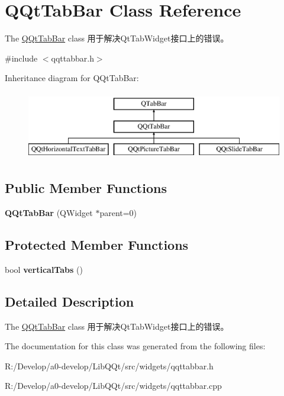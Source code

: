 \hypertarget{class_q_qt_tab_bar}{}\section{Q\+Qt\+Tab\+Bar Class Reference}
\label{class_q_qt_tab_bar}


The \mbox{\hyperlink{class_q_qt_tab_bar}{Q\+Qt\+Tab\+Bar}} class 用于解决\+Qt\+Tab\+Widget接口上的错误。  




{\ttfamily \#include $<$qqttabbar.\+h$>$}

Inheritance diagram for Q\+Qt\+Tab\+Bar\+:\begin{figure}[H]
\begin{center}
\leavevmode
\includegraphics[height=3.000000cm]{class_q_qt_tab_bar}
\end{center}
\end{figure}
\subsection*{Public Member Functions}
\begin{DoxyCompactItemize}
\item 
\mbox{\label{class_q_qt_tab_bar_aa15f619520c3707c7cbc90f5cb1c2c05}} 
{\bfseries Q\+Qt\+Tab\+Bar} (Q\+Widget $\ast$parent=0)
\end{DoxyCompactItemize}
\subsection*{Protected Member Functions}
\begin{DoxyCompactItemize}
\item 
\mbox{\label{class_q_qt_tab_bar_a73e9ea2f2ec44d4430fc23c880be93c8}} 
bool {\bfseries vertical\+Tabs} ()
\end{DoxyCompactItemize}


\subsection{Detailed Description}
The \mbox{\hyperlink{class_q_qt_tab_bar}{Q\+Qt\+Tab\+Bar}} class 用于解决\+Qt\+Tab\+Widget接口上的错误。 

The documentation for this class was generated from the following files\+:\begin{DoxyCompactItemize}
\item 
R\+:/\+Develop/a0-\/develop/\+Lib\+Q\+Qt/src/widgets/qqttabbar.\+h\item 
R\+:/\+Develop/a0-\/develop/\+Lib\+Q\+Qt/src/widgets/qqttabbar.\+cpp\end{DoxyCompactItemize}
